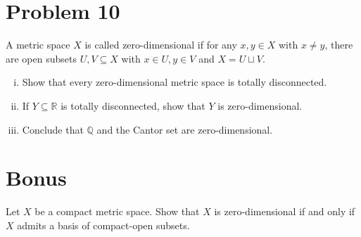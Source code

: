 \documentclass[8pt]{extarticle}
\newcommand{\Q}{\mathbb{Q}}
\newcommand{\R}{\mathbb{R}}
\begin{document}
  \section{Problem 10}%
  A metric space $X$ is called zero-dimensional if for any $x,y\in X$ with $x\neq y$, there are open subsets $U,V\subseteq X$ with $x\in U,y\in V$ and $X = U\sqcup V$.
  \begin{enumerate}[(i)]
    \item Show that every zero-dimensional metric space is totally disconnected.
    \item If $Y\subseteq \R$ is totally disconnected, show that $Y$ is zero-dimensional.
    \item Conclude that $\Q$ and the Cantor set are zero-dimensional.
  \end{enumerate}
  \section{Bonus}%
  Let $X$ be a compact metric space. Show that $X$ is zero-dimensional if and only if $X$ admits a basis of compact-open subsets.
\end{document}
